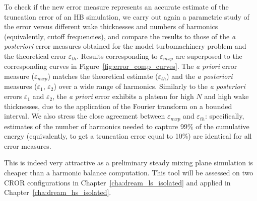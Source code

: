 To check if the new error measure represents an 
accurate estimate of the truncation error of 
an HB simulation, we carry out again a 
parametric study of the error versus different 
wake thicknesses and numbers of harmonics 
(equivalently, cutoff frequencies), and compare 
the results to those of the \emph{a posteriori} error measures 
obtained for the model turbomachinery problem 
and  the 
theoretical error $\varepsilon_{th}$. 
Results corresponding to $\varepsilon_{mxp}$ are 
superposed to the corresponding curves in Figure~\ref{fig:error_comp_curves}. 
The \emph{a priori} error measure ($\varepsilon_{mxp}$) matches 
the theoretical estimate ($\varepsilon_{th}$)
and the \emph{a posteriori} measures ($\varepsilon_1$, $\varepsilon_2$)
over a wide range of harmonics. Similarly to the \emph{a posteriori}
errors $\varepsilon_1$ and $\varepsilon_2$, the \emph{a priori} error
exhibits a plateau for high $N$ and high wake thicknesses, 
due to the application of the Fourier transform on a bounded interval. 
We also stress the close agreement between 
$\varepsilon_{mxp}$ and $\varepsilon_{th}$: specifically, 
estimates of the number of harmonics needed to capture 99\% 
of the cumulative energy (equivalently, to get a 
truncation error equal to 10\%) are identical for 
all error measures.

This is indeed very attractive as a preliminary
steady mixing plane simulation is cheaper than
a harmonic balance computation. This tool
will be assessed on two CROR configurations in 
Chapter~\ref{cha:dream_ls_isolated} and applied
in Chapter~\ref{cha:dream_hs_isolated}.
